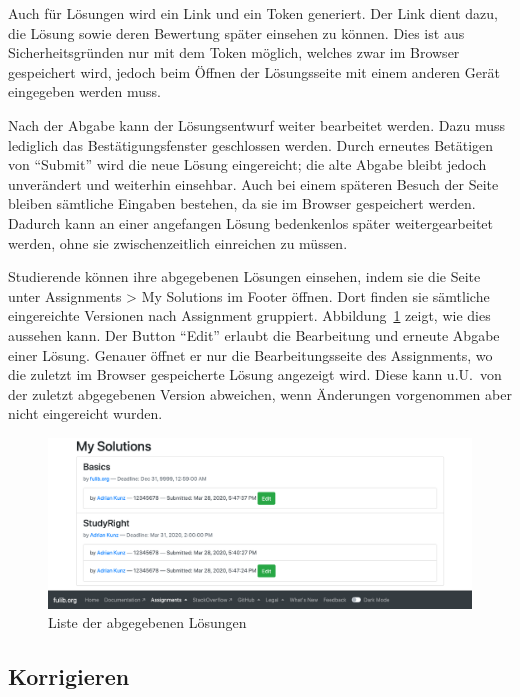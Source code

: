 Auch für Lösungen wird ein Link und ein Token generiert.
Der Link dient dazu, die Lösung sowie deren Bewertung später einsehen zu können.
Dies ist aus Sicherheitsgründen nur mit dem Token möglich, welches zwar im Browser gespeichert wird, jedoch beim Öffnen der Lösungsseite mit einem anderen Gerät eingegeben werden muss.

Nach der Abgabe kann der Lösungsentwurf weiter bearbeitet werden.
Dazu muss lediglich das Bestätigungsfenster geschlossen werden.
Durch erneutes Betätigen von ``Submit'' wird die neue Lösung eingereicht;
die alte Abgabe bleibt jedoch unverändert und weiterhin einsehbar.
Auch bei einem späteren Besuch der Seite bleiben sämtliche Eingaben bestehen, da sie im Browser gespeichert werden.
Dadurch kann an einer angefangen Lösung bedenkenlos später weitergearbeitet werden, ohne sie zwischenzeitlich einreichen zu müssen.

Studierende können ihre abgegebenen Lösungen einsehen, indem sie die Seite unter Assignments > My Solutions im Footer öffnen.
Dort finden sie sämtliche eingereichte Versionen nach Assignment gruppiert.
Abbildung~\ref{fig:my-solutions} zeigt, wie dies aussehen kann.
Der Button ``Edit'' erlaubt die Bearbeitung und erneute Abgabe einer Lösung.
Genauer öffnet er nur die Bearbeitungsseite des Assignments, wo die zuletzt im Browser gespeicherte Lösung angezeigt wird.
Diese kann u.U.\ von der zuletzt abgegebenen Version abweichen, wenn Änderungen vorgenommen aber nicht eingereicht wurden.

\begin{figure}
    \centering
    \includegraphics[width=\textwidth]{chapter/fulib.org/img/my-solutions.png}
    \caption{Liste der abgegebenen Lösungen}
    \label{fig:my-solutions}
\end{figure}

\subsection{Korrigieren}\label{subsec:correcting}

